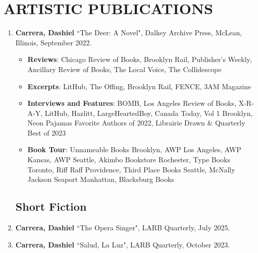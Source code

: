  \section{ARTISTIC PUBLICATIONS}
 \begin{enumerate}
 
 \subsection{Novels}
 \item \textbf{Carrera, Dashiel} ``The Deer: A Novel", Dalkey Archive Press, McLean, Illinois, September 2022. \\
 	\begin{itemize}
		\item \textbf{Reviews}: Chicago Review of Books, Brooklyn Rail, Publisher's Weekly, Ancillary Review of Books, The Local Voice, The Collidescope
		\item \textbf{Excerpts}: LitHub, The Offing, Brooklyn Rail, FENCE, 3AM Magazine
		\item \textbf{Interviews and Features}: BOMB, Los Angeles Review of Books, X-R-A-Y, LitHub, Hazlitt, LargeHeartedBoy, Canada Today, Vol 1 Brooklyn, Neon Pajamas Favorite Authors of 2022, Librairie Drawn \& Quarterly Best of 2023	
		\item \textbf{Book Tour}: Unnameable Books Brooklyn, AWP Los Angeles, AWP Kansas, AWP Seattle, Akimbo Bookstore Rochester, Type Books Toronto, Riff Raff Providence, Third Place Books Seattle, McNally Jackson Seaport Manhattan, Blacksburg Books	
	\end{itemize} 
 
 
\subsection{Short Fiction}
\item \textbf{Carrera, Dashiel} ``The Opera Singer", LARB Quarterly, July 2025. \\
\item \textbf{Carrera, Dashiel} ``Salud, La Luz", LARB Quarterly, October 2023. \\



\end{enumerate}
